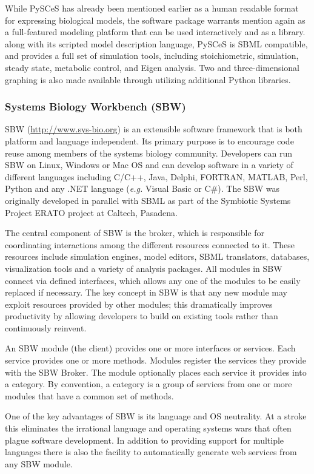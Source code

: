 \documentclass[]{article}
\begin{document}
While PySCeS has already been mentioned earlier as a human readable
format for expressing biological models, the software package warrants
mention again as a full-featured modeling platform that can be used
interactively and as a library. along with its scripted model
description language, PySCeS is SBML compatible, and provides a full set
of simulation tools, including stoichiometric, simulation, steady state,
metabolic control, and Eigen analysis. Two and three-dimensional
graphing is also made available through utilizing additional Python
libraries.

\subsubsection{Systems Biology Workbench (SBW)}

SBW (\url{http://www.sys-bio.org}) \autocite{bergmann2006sbw} is an
extensible software framework that is both platform and language
independent. Its primary purpose is to encourage code reuse among
members of the systems biology community. Developers can run SBW on
Linux, Windows or Mac OS and can develop software in a variety of
different languages including C/C++, Java, Delphi, FORTRAN, MATLAB,
Perl, Python and any .NET language (\emph{e.g.} Visual Basic or C\#).
The SBW was originally developed in parallel with SBML as part of the
Symbiotic Systems Project ERATO project at Caltech, Pasadena.

The central component of SBW is the broker, which is responsible for
coordinating interactions among the different resources connected to it.
These resources include simulation engines, model editors, SBML
translators, databases, visualization tools and a variety of analysis
packages. All modules in SBW connect via defined interfaces, which
allows any one of the modules to be easily replaced if necessary. The
key concept in SBW is that any new module may exploit resources provided
by other modules; this dramatically improves productivity by allowing
developers to build on existing tools rather than continuously reinvent.

An SBW module (the client) provides one or more interfaces or services.
Each service provides one or more methods. Modules register the services
they provide with the SBW Broker. The module optionally places each
service it provides into a category. By convention, a category is a
group of services from one or more modules that have a common set of
methods.

One of the key advantages of SBW is its language and OS neutrality. At a
stroke this eliminates the irrational language and operating systems
wars that often plague software development. In addition to providing
support for multiple languages there is also the facility to
automatically generate web services from any SBW module.
\end{document}
